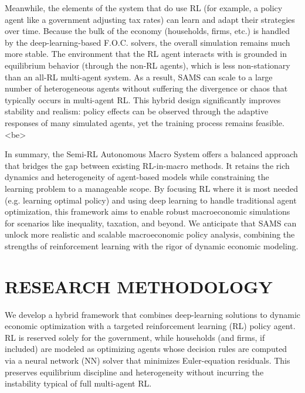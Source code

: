 \documentclass[11pt]{article}
\begin{document}
Meanwhile, the elements of the system that do use RL (for example, a policy agent like a government adjusting tax rates) can learn and adapt their strategies over time. Because the bulk of the economy (households, firms, etc.) is handled by the deep-learning-based F.O.C. solvers, the overall simulation remains much more stable. The environment that the RL agent interacts with is grounded in equilibrium behavior (through the non-RL agents), which is less non-stationary than an all-RL multi-agent system. As a result, SAMS can scale to a large number of heterogeneous agents without suffering the divergence or chaos that typically occurs in multi-agent RL. This hybrid design significantly improves stability and realism: policy effects can be observed through the adaptive responses of many simulated agents, yet the training process remains feasible. <be>

In summary, the Semi-RL Autonomous Macro System offers a balanced approach that bridges the gap between existing RL-in-macro methods. It retains the rich dynamics and heterogeneity of agent-based models while constraining the learning problem to a manageable scope. By focusing RL where it is most needed (e.g. learning optimal policy) and using deep learning to handle traditional agent optimization, this framework aims to enable robust macroeconomic simulations for scenarios like inequality, taxation, and beyond. We anticipate that SAMS can unlock more realistic and scalable macroeconomic policy analysis, combining the strengths of reinforcement learning with the rigor of dynamic economic modeling.


\section{RESEARCH METHODOLOGY}

We develop a hybrid framework that combines deep-learning solutions to dynamic economic optimization with a targeted reinforcement learning (RL) policy agent. RL is reserved solely for the government, while households (and firms, if included) are modeled as optimizing agents whose decision rules are computed via a neural network (NN) solver that minimizes Euler-equation residuals. This preserves equilibrium discipline and heterogeneity without incurring the instability typical of full multi-agent RL.
\end{document}
